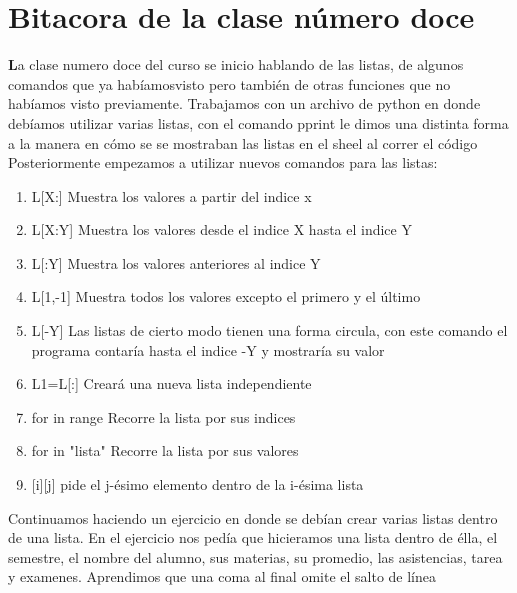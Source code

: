 \documentclass{book}
\begin{document}
\section{Bitacora de la clase número doce}
\textbf La clase numero doce del curso se inicio hablando de las listas, de algunos comandos que ya habíamosvisto pero también de otras funciones que no habíamos visto previamente. Trabajamos con un archivo de python en donde debíamos utilizar varias listas, con el comando \color{blue} pprint \color{black} le dimos una distinta forma a la manera en cómo se se mostraban las listas en el sheel al correr el código\\
Posteriormente empezamos a utilizar nuevos comandos para las listas: 
\begin{enumerate}
	\item \color{green}L[X:] \color{orange} Muestra los valores a partir del indice x
	\item \color{green} L[X:Y] \color{orange} Muestra los valores desde el indice X hasta el indice Y \color{black}
	\item \color{green} L[:Y] \color{orange} Muestra los valores anteriores al indice Y \color{black} 
	\item \color{green} L[1,-1] \color{orange} Muestra todos los valores excepto el primero y el último \color{black}
	\item \color{green} L[-Y] \color{orange} Las listas de cierto modo tienen una forma circula, con este comando el programa contaría hasta el indice -Y y mostraría su valor \color{black}
	\item L1=L[:] \color{orange} Creará una nueva lista independiente \color{black}
	\item \color{green} for in range \color{orange} Recorre la lista por sus indices \color{black}
	\item \color{green} for in "lista" \color{orange} Recorre la lista por sus valores \color{black}
	\item \color{green} [i][j] \color{orange} pide el j-ésimo elemento dentro de la i-ésima lista 
\end{enumerate}
\color{black} Continuamos haciendo un ejercicio en donde se debían crear varias listas dentro de una lista. En el ejercicio nos pedía que hicieramos una lista dentro de élla, el semestre, el nombre del alumno, sus materias, su promedio, las asistencias, tarea y examenes. Aprendimos que una coma al final omite el salto de línea\\
\end{document}
